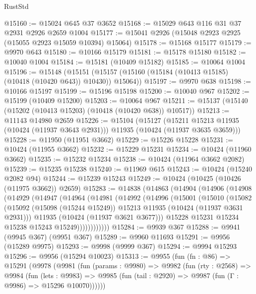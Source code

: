 \begin{lexlean}{RustStd}
\begin{coremodule}
@15160 := @15024 @645 @37 @3652
@15168 := @15029 @643 @116 @31 @37 @2931 @2926 @2659 @1004
@15177 := @15041 @2926 (@15048 @2923 @2925 (@15055 @2923 @15059 @10394) @15064)
@15178 := @15168 @15177
@15179 := @9970 @643
@15180 := @10166 @15179
@15181 := @15178 @15180
@15182 := @10040 @1004
@15184 := @15181 (@10409 @15182)
@15185 := @10064 @1004
@15196 := @15148
    (@15151 (@15157 (@15160 (@15184 (@10413 @15185) (@10418 (@10420 @643)) @10430)) @15064))
@15197 := @9970 @638
@15198 := @10166 @15197
@15199 := @15196 @15198
@15200 := @10040 @967
@15202 := @15199 (@10409 @15200)
@15203 := @10064 @967
@15211 := @15137 (@15140 (@15202 (@10413 @15203) (@10418 (@10420 @638)) @10517))
@15213 := @11143 @14980 @2659
@15226 := @15104
    (@15127
      (@15211 @15213 @11935 (@10424 (@11937 @3643 @2931)))
      @11935
      (@10424 (@11937 @3635 @3659)))
@15228 := @11950 (@11951 @3662)
@15229 := @15226 @15228
@15231 := @10424 (@11955 @3662)
@15232 := @15229 @15231
@15234 := @10424 (@11960 @3662)
@15235 := @15232 @15234
@15238 := @10424 (@11964 @3662 @2082)
@15239 := @15235 @15238
@15240 := @11969 @615
@15243 := @10424 (@15240 @2082 @94)
@15244 := @15239 @15243
@15249 := @10424 (@10425 (@10426 (@11975 @3662)) @2659)
@15283 := @14838
    (@14863
      (@14904
        (@14906
          (@14908
            (@14929
              (@14947
                (@14964
                  (@14981
                    (@14992
                      (@14996
                        (@15001
                          (@15010
                            (@15082
                              (@15092
                                (@15098 (@15244 @15249))
                                @15213
                                @11935
                                (@10424 (@11937 @3631 @2931)))
                              @11935
                              (@10424 (@11937 @3621 @3677)))
                            @15228
                            @15231
                            @15234
                            @15238
                            @15243
                            @15249))))))))))))
@15284 := @9939 @367
@15288 := @9941 (@9945 @367) (@9951 @367)
@15289 := @9960 @11693
@15291 := @9956 (@15289 @9975)
@15293 := @9998 (@9999 @367)
@15294 := @9994 @15293
@15296 := @9956 (@15294 @10023)
@15313 := @9955
    (fun (fn : @86) =>
    @15291
      (@9978
        (@9981
          (fun (params : @9980) =>
          @9982
            (fun (rty : @2568) =>
            @9984
              (fun (lets : @9983) =>
              @9985 (fun (tail : @2920) => @9987 (fun (Γ : @9986) => @15296 @10070))))))

\end{coremodule}
\end{lexlean}
